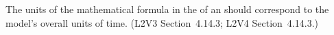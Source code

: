 The units of the mathematical formula in the  of an \Event
should correspond to the model's overall units of time.  (L2V3
Section~4.14.3; L2V4 Section~4.14.3.)
